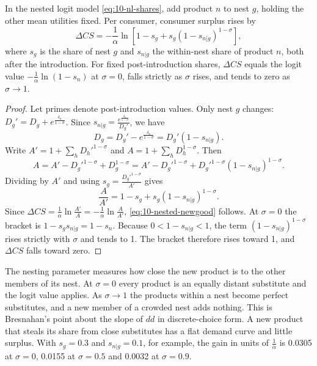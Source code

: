 \begin{proposition}\label{prop:10-nested-newgood}
In the nested logit model \eqref{eq:10-nl-shares}, add product $n$ to nest $g$, holding the other mean utilities
fixed. Per consumer, consumer surplus rises by
\begin{equation}\label{eq:10-nested-newgood}
\Delta CS = -\frac{1}{\alpha}\ln\left[1 - s_g + s_g\left(1 - s_{n|g}\right)^{1-\sigma}\right],
\end{equation}
where $s_g$ is the share of nest $g$ and $s_{n|g}$ the within-nest share of product $n$, both after the
introduction. For fixed post-introduction shares, $\Delta CS$ equals the logit value $-\frac{1}{\alpha}\ln(1-s_n)$
at $\sigma = 0$, falls strictly as $\sigma$ rises, and tends to zero as $\sigma\to 1$.
\end{proposition}

\begin{proof}
Let primes denote post-introduction values. Only nest $g$ changes:
$D_g' = D_g + e^{\frac{\delta_n}{1-\sigma}}$. Since $s_{n|g} = \frac{e^{\frac{\delta_n}{1-\sigma}}}{D_g'}$, we have
\begin{equation*}
D_g = D_g' - e^{\frac{\delta_n}{1-\sigma}} = D_g'\left(1 - s_{n|g}\right).
\end{equation*}
Write $A' = 1 + \sum_h D_h'^{1-\sigma}$ and $A = 1 + \sum_h D_h^{1-\sigma}$. Then
\begin{equation*}
A = A' - D_g'^{1-\sigma} + D_g^{1-\sigma} = A' - D_g'^{1-\sigma} + D_g'^{1-\sigma}\left(1 - s_{n|g}\right)^{1-\sigma}.
\end{equation*}
Dividing by $A'$ and using $s_g = \frac{D_g'^{1-\sigma}}{A'}$ gives
\begin{equation*}
\frac{A}{A'} = 1 - s_g + s_g\left(1 - s_{n|g}\right)^{1-\sigma}.
\end{equation*}
Since $\Delta CS = \frac{1}{\alpha}\ln\frac{A'}{A} = -\frac{1}{\alpha}\ln\frac{A}{A'}$, \eqref{eq:10-nested-newgood}
follows. At $\sigma = 0$ the bracket is $1 - s_g s_{n|g} = 1 - s_n$. Because $0 < 1 - s_{n|g} < 1$, the term
$(1 - s_{n|g})^{1-\sigma}$ rises strictly with $\sigma$ and tends to 1. The bracket therefore rises toward 1, and
$\Delta CS$ falls toward zero.
\end{proof}

The nesting parameter measures how close the new product is to the other members of its nest. At $\sigma = 0$
every product is an equally distant substitute and the logit value applies. As $\sigma \to 1$ the products within
a nest become perfect substitutes, and a new member of a crowded nest adds nothing. This is Bresnahan's point about
the slope of $dd$ in discrete-choice form. A new product that steals its share from close substitutes has a flat
demand curve and little surplus. With $s_g = 0.3$ and $s_{n|g} = 0.1$, for example, the gain in units of
$\frac{1}{\alpha}$ is 0.0305 at $\sigma = 0$, 0.0155 at $\sigma = 0.5$ and 0.0032 at $\sigma = 0.9$.

